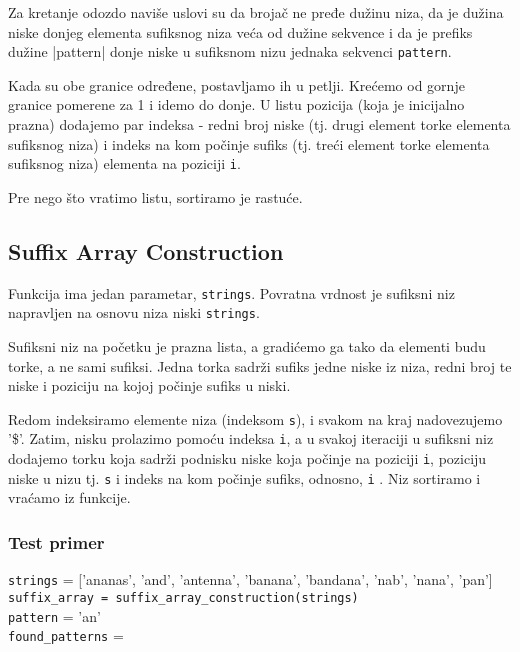 Za kretanje odozdo naviše uslovi su da brojač ne pređe dužinu niza, da je dužina niske donjeg elementa sufiksnog niza veća od dužine sekvence i da je prefiks dužine |pattern| donje niske u sufiksnom nizu jednaka sekvenci \texttt{pattern}.

Kada su obe granice određene, postavljamo ih u petlji. Krećemo od gornje granice pomerene za 1 i idemo do donje. U listu pozicija (koja je inicijalno prazna) dodajemo par indeksa - redni broj niske (tj. drugi element torke elementa sufiksnog niza) i indeks na kom počinje sufiks (tj. treći element torke elementa sufiksnog niza) elementa na poziciji \texttt{i}.

Pre nego što vratimo listu, sortiramo je rastuće.




\subsection{Suffix Array Construction}
\label{suffixArrayConstructionM}

Funkcija ima jedan parametar, \texttt{strings}. Povratna vrdnost je sufiksni niz napravljen na osnovu niza niski \texttt{strings}.

Sufiksni niz na početku je prazna lista, a gradićemo ga tako da elementi budu torke, a ne sami sufiksi. Jedna torka sadrži sufiks jedne niske iz niza, redni broj te niske i poziciju na kojoj počinje sufiks u niski.

Redom indeksiramo elemente niza (indeksom \texttt{s}), i svakom na kraj nadovezujemo '\$'. Zatim, nisku prolazimo pomoću indeksa \texttt{i}, a u svakoj iteraciji u sufiksni niz dodajemo torku koja sadrži podnisku niske koja počinje na poziciji \texttt{i}, poziciju niske u nizu tj. \texttt{s} i indeks na kom počinje sufiks, odnosno, \texttt{i} . Niz sortiramo i vraćamo iz funkcije.





\subsubsection{Test primer}

\noindent\texttt{strings} = ['ananas', 'and', 'antenna', 'banana', 'bandana', 'nab', 'nana', 'pan']
\\\texttt{suffix\_array = suffix\_array\_construction(strings)}
\\\texttt{pattern} = 'an'
\\\texttt{found\_patterns} =



